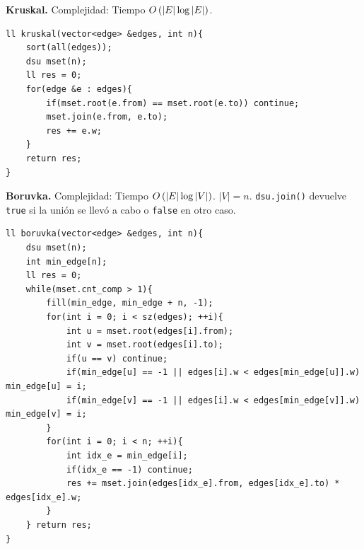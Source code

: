 \textbf{Kruskal.} Complejidad: Tiempo $O\left( |E|\log |E| \right)$.
\begin{verbatim}
ll kruskal(vector<edge> &edges, int n){
    sort(all(edges));
    dsu mset(n);
    ll res = 0;
    for(edge &e : edges){
        if(mset.root(e.from) == mset.root(e.to)) continue;
        mset.join(e.from, e.to);
        res += e.w;
    }
    return res;
}
\end{verbatim}



\textbf{Boruvka.} Complejidad: Tiempo $O\left( |E|\log |V| \right)$. $|V| = n$. \texttt{dsu.join()} devuelve \texttt{true} si la unión se llevó a cabo o \texttt{false} en otro caso.
\begin{verbatim}
ll boruvka(vector<edge> &edges, int n){
    dsu mset(n);
    int min_edge[n];
    ll res = 0;
    while(mset.cnt_comp > 1){
        fill(min_edge, min_edge + n, -1);
        for(int i = 0; i < sz(edges); ++i){
            int u = mset.root(edges[i].from);
            int v = mset.root(edges[i].to);
            if(u == v) continue;
            if(min_edge[u] == -1 || edges[i].w < edges[min_edge[u]].w) min_edge[u] = i;
            if(min_edge[v] == -1 || edges[i].w < edges[min_edge[v]].w) min_edge[v] = i;
        }
        for(int i = 0; i < n; ++i){
            int idx_e = min_edge[i];
            if(idx_e == -1) continue;
            res += mset.join(edges[idx_e].from, edges[idx_e].to) * edges[idx_e].w;
        }
    } return res;
}
\end{verbatim}



